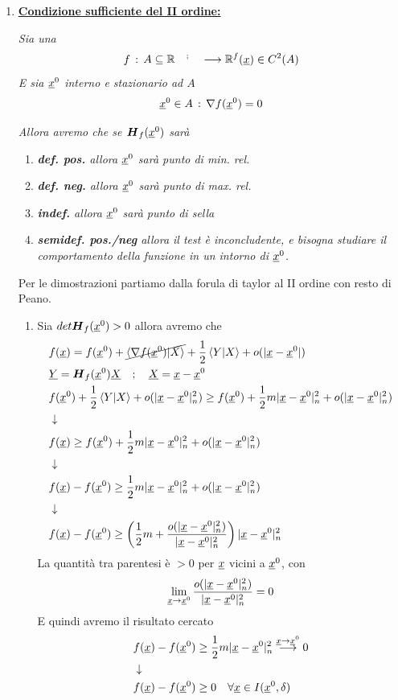 \begin{enumerate}
	\newpage
	
	\item \textbf{\underline{Condizione sufficiente del II ordine:}}
	
	\textit{Sia una}
	\begin{align}
		f \, : \, A\subseteq \mathbb{R}^{\quad ; \quad} \longrightarrow \mathbb{R}^{f}(\underline{x})\in C^2(A)
	\end{align}
	\textit{E sia $\underline{x}^0$ interno e stazionario ad $A$}
	\begin{align}
		\underline{x}^0\in A \, : \, \nabla f(\underline{x}^0)=0
	\end{align}
	
	\textit{Allora avremo che se $\boldsymbol{H}_{f} (\underline{x}^0)$ sarà}
	\begin{enumerate}
		\item \textit{\textbf{def. pos.} allora $\underline{x}^0$ sarà punto di min. rel.}
		\item \textit{\textbf{def. neg.} allora $\underline{x}^0$ sarà punto di max. rel.}
		\item \textit{\textbf{indef.} allora $\underline{x}^0$ sarà punto di sella}
		\item \textit{\textbf{semidef. pos./neg} allora il test è inconcludente, e bisogna studiare il comportamento della funzione in un intorno di $\underline{x}^0$.}	
	\end{enumerate}
	
	\bigskip
	
	Per le dimostrazioni partiamo dalla forula di taylor al II ordine con resto di Peano.
	
	\begin{enumerate}
		\item Sia $det\boldsymbol{H}_{f} (\underline{x}^0)>0$ allora avremo che
		\begin{align}
			{}&f(\underline{x})= f(\underline{x}^0) + \cancel{\braket{\nabla f(\underline{x}^0)|X}} + \frac{1}{2} \braket{Y|X} + o(|\underline{x} - \underline{x}^0|)\\
			&\underline{Y}= \boldsymbol{H}_{f} (\underline{x}^0) \underline{X} \quad ; \quad \underline{X}= \underline{x} - \underline{x}^0 \nonumber
			\nonumber \\
			&f(\underline{x}^0)+ \frac{1}{2} \braket{Y|X} + o(|\underline{x} - \underline{x}^0|_n^2) \geq f(\underline{x}^0) + \frac{1}{2} m |\underline{x}-\underline{x}^0|_n^2 + o(|\underline{x} - \underline{x}^0|_n^2) \nonumber \\ &\downarrow \nonumber \\
			& f(\underline{x}) \geq f(\underline{x}^0) + \frac{1}{2} m |\underline{x}-\underline{x}^0|_n^2 + o(|\underline{x} - \underline{x}^0|_n^2) \nonumber \\ &\downarrow \nonumber \\
			& f(\underline{x}) - f(\underline{x}^0) \geq  \frac{1}{2} m |\underline{x}-\underline{x}^0|_n^2 + o(|\underline{x} - \underline{x}^0|_n^2) \nonumber \\ &\downarrow \nonumber \\
			&f(\underline{x}) - f(\underline{x}^0) \geq  \left(\frac{1}{2} m + \frac{o(|\underline{x} - \underline{x}^0|_n^2)}{|\underline{x}-\underline{x}^0|_n^2} \right) |\underline{x}-\underline{x}^0|_n^2 
		\end{align}
		La quantità tra parentesi è $>0$ per $\underline{x}$ vicini a $\underline{x}^0$, con 
		\begin{align}
			\underset{\underline{x} \rightarrow \underline{x}^0}{\lim} \,\frac{o(|\underline{x} - \underline{x}^0|_n^2)}{|\underline{x}-\underline{x}^0|_n^2}=0
		\end{align}
		E quindi avremo il risultato cercato
		\begin{align}
			{}&f(\underline{x}) - f(\underline{x}^0) \geq  \frac{1}{2} m |\underline{x}-\underline{x}^0|_n^2 \overset{\underline{x} \rightarrow \underline{x}^0}{\longrightarrow}0\nonumber \\ &\downarrow \nonumber \\
			& f(\underline{x}) - f(\underline{x}^0)\geq 0 \quad \forall \underline{x} \in I(\underline{x}^0,\delta)
		\end{align}
		

\end{enumerate}
\end{enumerate}
